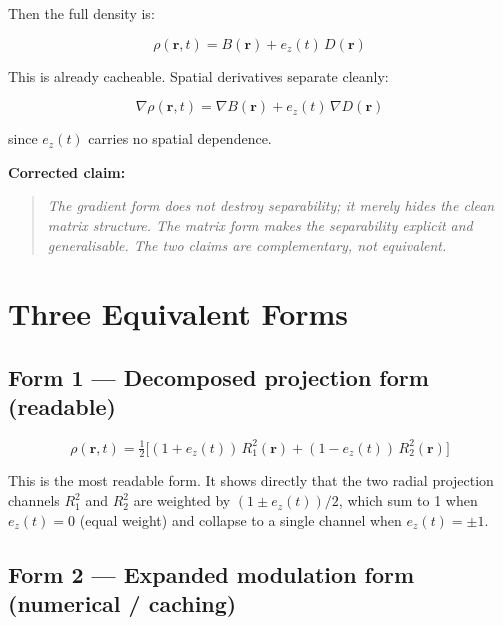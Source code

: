 \documentclass[11pt, a4paper, oneside]{article}
\newcommand{\Ri}[1]{R_{#1}^2(\mathbf{r})}          %
\newcommand{\ez}{e_z(t)}
\newcommand{\Bvec}{B(\mathbf{r})}
\newcommand{\Dvec}{D(\mathbf{r})}
\begin{document}
Then the full density is:

\begin{equation}
  \boxed{\rho(\mathbf{r},t) = \Bvec + \ez\,\Dvec}
  \label{eq:rho_BD}
\end{equation}

This is already cacheable. Spatial derivatives separate cleanly:

\begin{equation}
  \nabla\rho(\mathbf{r},t) = \nabla\Bvec + \ez\,\nabla\Dvec
  \label{eq:grad_rho}
\end{equation}

since $\ez$ carries no spatial dependence.

\medskip
\noindent\textbf{Corrected claim:}
\begin{quote}
  \itshape
  The gradient form does not destroy separability; it merely hides the
  clean matrix structure. The matrix form makes the separability
  \emph{explicit} and \emph{generalisable}. The two claims are
  complementary, not equivalent.
\end{quote}

\section{Three Equivalent Forms}
\label{sec:three_forms}

\subsection{Form 1 — Decomposed projection form (readable)}

\begin{equation}
  \rho(\mathbf{r},t)
  = \tfrac{1}{2}\bigl[(1+\ez)\,\Ri{1} + (1-\ez)\,\Ri{2}\bigr]
  \label{eq:form1}
\end{equation}

This is the most readable form. It shows directly that the two radial
projection channels $R_1^2$ and $R_2^2$ are weighted by
$(1\pm\ez)/2$, which sum to 1 when $\ez = 0$ (equal weight)
and collapse to a single channel when $\ez = \pm 1$.

\subsection{Form 2 — Expanded modulation form (numerical / caching)}
\end{document}
